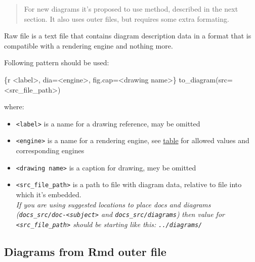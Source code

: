 \documentclass[
  12pt,
  a4paper,
  12pt,
  oneside,
  openany]{book}
\newenvironment{Shaded}{\begin{snugshade}}{\end{snugshade}}
\newcommand{\DataTypeTok}[1]{\textcolor[rgb]{0.27,0.27,0.27}{#1}}
\newcommand{\StringTok}[1]{\textcolor[rgb]{0.5,0.5,0.5}{#1}}
\providecommand{\tightlist}{%
  \setlength{\itemsep}{0pt}\setlength{\parskip}{0pt}}
\begin{document}
\begin{quote}
For new diagrams it's proposed to use method, described in the next section. It also uses outer files, but requires some extra formating.
\end{quote}

Raw file is a text file that contains diagram description data in a format that is compatible with a rendering engine and nothing more.

Following pattern should be used:

\begin{Shaded}
\begin{Highlighting}[]
\StringTok{\textasciigrave{}\textasciigrave{}\textasciigrave{}}\DataTypeTok{\{r \textless{}label\textgreater{}, dia=\textquotesingle{}\textless{}engine\textgreater{}\textquotesingle{}, fig.cap=\textquotesingle{}\textless{}drawing name\textgreater{}\textquotesingle{}\}}
\DataTypeTok{  to\_diagram(src=\textquotesingle{}\textless{}src\_file\_path\textgreater{}\textquotesingle{})}
\StringTok{\textasciigrave{}\textasciigrave{}\textasciigrave{}}
\end{Highlighting}
\end{Shaded}

where:

\begin{itemize}
\tightlist
\item
  \texttt{\textless{}label\textgreater{}} is a name for a drawing reference, may be omitted
\item
  \texttt{\textless{}engine\textgreater{}} is a name for a rendering engine, see \protect\hyperlink{reference-engines}{table} for allowed values and corresponding engines
\item
  \texttt{\textless{}drawing\ name\textgreater{}} is a caption for drawing, mey be omitted
\item
  \texttt{\textless{}src\_file\_path\textgreater{}} is a path to file with diagram data, relative to file into which it's embedded.\\
  \emph{If you are using suggested locations to place docs and diagrams (\texttt{docs\_src/doc-\textless{}subject\textgreater{}} and \texttt{docs\_src/diagrams})} \emph{then value for \texttt{\textless{}src\_file\_path\textgreater{}} should be starting like this: \texttt{../diagrams/}}
\end{itemize}

\hypertarget{usage-embed-rmd}{%
\subsection{Diagrams from Rmd outer file}\label{usage-embed-rmd}}
\end{document}
